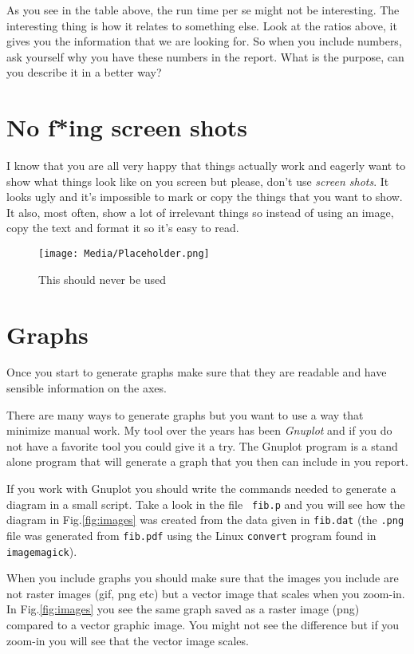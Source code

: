 \documentclass[a4paper,11pt]{article}
\begin{document}
As you see in the table above, the run time per se might not be
interesting. The interesting thing is how it relates to something
else. Look at the ratios above, it gives you the information that we
are looking for. So when you include numbers, ask yourself why you
have these numbers in the report. What is the purpose, can you
describe it in a better way?

\section*{No f*ing screen shots}

I know that you are all very happy that things actually work and
eagerly want to show what things look like on you screen but please,
don't use {\em screen shots}. It looks ugly and it's impossible to mark or
copy the things that you want to show. It also, most often, show a lot
of irrelevant things so instead of using an image, copy the text and
format it so it's easy to read.

\begin{figure}
  \centering
  \texttt{[image: Media/Placeholder.png]}
  \label{fig:screenshot}
  \caption{This should never be used}
\end{figure}

\section*{Graphs}

Once you start to generate graphs make sure that they are readable and
have sensible information on the axes.

There are many ways to generate graphs but you want to use a way that
minimize manual work. My tool over the years has been {\em Gnuplot}
and if you do not have a favorite tool you could give it a try. The
Gnuplot program is a stand alone program that will generate a
graph that you then can include in you report.

If you work with Gnuplot you should write the commands needed to
generate a diagram in a small script. Take a look in the file {\tt
  fib.p} and you will see how the diagram in Fig.\ref{fig:images} was
created from the data given in {\tt fib.dat} (the {\tt .png} file was
generated from {\tt fib.pdf} using the Linux {\tt convert}
program found in {\tt imagemagick}).

When you include graphs you should make sure that the images you
include are not raster images (gif, png etc) but a vector image that
scales when you zoom-in. In Fig.\ref{fig:images} you see the same
graph saved as a raster image (png) compared to a vector graphic
image. You might not see the difference but if you zoom-in you will
see that the vector image scales.
\end{document}
